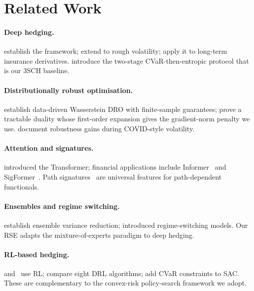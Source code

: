 \documentclass[11pt]{article}
\begin{document}
\section{Related Work}\label{sec:related}

\paragraph{Deep hedging.}  \citet{buehler2019deep} establish the framework; \citet{horvath2021deep} extend to rough volatility; \citet{carbonneau2021deep} apply it to long-term insurance derivatives.  \citet{kozyra2019deep} introduce the two-stage CVaR-then-entropic protocol that is our $3$SCH baseline.

\paragraph{Distributionally robust optimisation.}  \citet{esfahani2018data} establish data-driven Wasserstein DRO with finite-sample guarantees; \citet{blanchet2019quantifying} prove a tractable duality whose first-order expansion gives the gradient-norm penalty we use.  \citet{lutkebohmert2019robust} document robustness gains during COVID-style volatility.

\paragraph{Attention and signatures.}  \citet{vaswani2017attention} introduced the Transformer; financial applications include Informer~\citep{zhou2021informer} and SigFormer~\citep{tong2023sigformer}.  Path signatures~\citep{lyons1998differential,kidger2020signatory} are universal features for path-dependent functionals.

\paragraph{Ensembles and regime switching.}  \citet{dietterich2000ensemble} establish ensemble variance reduction; \citet{hamilton1989new} introduced regime-switching models.  Our RSE adapts the mixture-of-experts paradigm to deep hedging.

\paragraph{RL-based hedging.}  \citet{kolm2019dynamic} and~\citet{cao2021deep} use RL; \citet{neagu2025drl} compare eight DRL algorithms; \citet{huang2025sac} add CVaR constraints to SAC.  These are complementary to the convex-risk policy-search framework we adopt.
\end{document}
